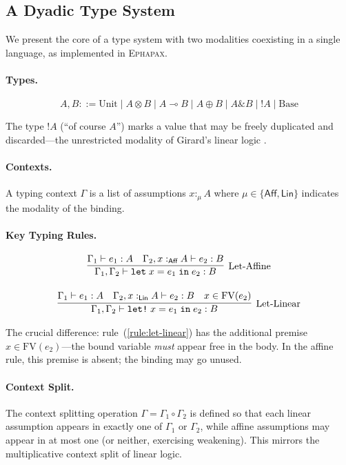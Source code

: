 \documentclass[11pt,a4paper]{article}
\newcommand{\Linear}{\textsf{Lin}}
\newcommand{\Affine}{\textsf{Aff}}
\newcommand{\ephapax}{\textsc{Ephapax}}
\newcommand{\tensor}{\otimes}
\newcommand{\lolli}{\multimap}
\newcommand{\bang}{!}
\begin{document}
\subsection{A Dyadic Type System}

We present the core of a type system with two modalities coexisting
in a single language, as implemented in \ephapax{}.

\paragraph{Types.}
\[
  A, B ::= \text{Unit} \mid A \tensor B \mid A \lolli B \mid A \oplus B
    \mid A \mathbin{\&} B \mid \bang A \mid \text{Base}
\]

The type $\bang A$ (``of course $A$'') marks a value that may be
freely duplicated and discarded---the unrestricted modality of
Girard's linear logic \citep{girard1987linear}.

\paragraph{Contexts.}
A typing context $\Gamma$ is a list of assumptions $x :_\mu A$ where
$\mu \in \{\Affine, \Linear\}$ indicates the modality of the
binding.

\paragraph{Key Typing Rules.}

\begin{gather}
\infer[\text{Let-Affine}]{
  \Gamma_1, \Gamma_2 \vdash \texttt{let}\; x = e_1 \;\texttt{in}\; e_2 : B
}{
  \Gamma_1 \vdash e_1 : A
  &
  \Gamma_2, x :_{\Affine} A \vdash e_2 : B
}
\label{rule:let-affine}
\\[10pt]
\infer[\text{Let-Linear}]{
  \Gamma_1, \Gamma_2 \vdash \texttt{let!}\; x = e_1 \;\texttt{in}\; e_2 : B
}{
  \Gamma_1 \vdash e_1 : A
  &
  \Gamma_2, x :_{\Linear} A \vdash e_2 : B
  &
  x \in \text{FV}(e_2)
}
\label{rule:let-linear}
\end{gather}

The crucial difference: rule~(\ref{rule:let-linear}) has the
additional premise $x \in \text{FV}(e_2)$---the bound variable
\emph{must} appear free in the body. In the affine rule, this
premise is absent; the binding may go unused.

\paragraph{Context Split.}
The context splitting operation $\Gamma = \Gamma_1 \circ \Gamma_2$
is defined so that each linear assumption appears in exactly one of
$\Gamma_1$ or $\Gamma_2$, while affine assumptions may appear in at
most one (or neither, exercising weakening). This mirrors the
multiplicative context split of linear logic.
\end{document}
